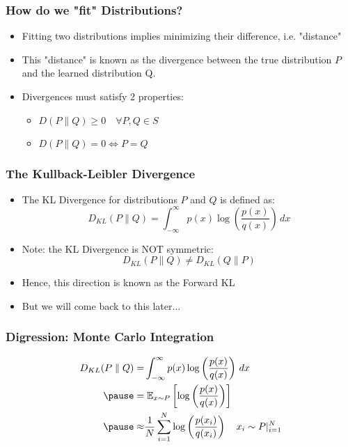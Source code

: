 \documentclass{beamer}
\begin{document}
\begin{frame}
  \frametitle{How do we "fit" Distributions?}
  \begin{itemize}
    \item Fitting two distributions implies minimizing their difference,
      i.e. "distance"
    \item This "distance" is known as the divergence between the true distribution
    $P$ and the learned distribution Q.
    \pause
    \item Divergences must satisfy 2 properties:
    \begin{itemize}
      \item $D(P \parallel Q ) \geq 0 \quad \forall P, Q \in S$
      \item $D(P \parallel Q ) = 0 \iff P = Q$
    \end{itemize}
  \end{itemize}

\end{frame}

\begin{frame}
  \frametitle{The Kullback-Leibler Divergence}
  \begin{itemize}
    \item The KL Divergence for distributions $P$ and $Q$ is defined as:
    \begin{equation*}
      D_{KL} (P \parallel Q) = \int_{-\infty}^{\infty} p(x)\log \left({\frac {p(x)}{q(x)}}\right)\,dx
    \end{equation*}
    \pause
    \item Note: the KL Divergence is NOT symmetric:
    \begin{equation*}
      D_{KL} (P \parallel Q) \not= D_{KL} (Q \parallel P)
    \end{equation*}
    \item Hence, this direction is known as the Forward KL
    \pause
    \item But we will come back to this later...
  \end{itemize}
\end{frame}


\begin{frame}
  \frametitle{Digression: Monte Carlo Integration}
    \begin{equation*}
      \begin{aligned}
      D_{KL} (P \parallel Q) =& \int_{-\infty}^{\infty} p(x)\log \left({\frac {p(x)}{q(x)}}\right)\,dx \\
      \pause
      =& \; \mathbb{E}_{x \sim P} \left[ \log \left( \frac{p(x)}{q(x)} \right) \right] \\
      \pause
      \approx& \frac{1}{N}\sum_{i=1}^{N} \log \left( \frac{p(x_i)}{q(x_i)} \right) \quad x_i \sim P \vert_{i=1}^{N}
      \end{aligned}
    \end{equation*}
\end{frame}
\end{document}
